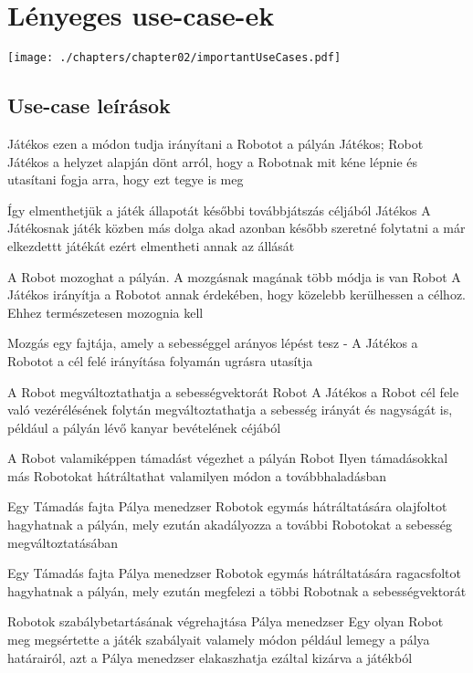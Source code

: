 \section{Lényeges use-case-ek}
\texttt{[image: ./chapters/chapter02/importantUseCases.pdf]}

\subsection{Use-case leírások}

%
{Játékos ezen a módon tudja irányítani a Robotot a pályán}%
{Játékos; Robot}%
{Játékos a helyzet alapján dönt arról, hogy a Robotnak mit kéne lépnie és utasítani fogja arra, hogy ezt tegye is meg}

%
{Így elmenthetjük a játék állapotát későbbi továbbjátszás céljából}%
{Játékos}%
{A Játékosnak játék közben más dolga akad azonban később szeretné folytatni a már elkezdettt játékát ezért elmentheti annak az állását}

%
{A Robot mozoghat a pályán. A mozgásnak magának több módja is van}
{Robot}
{A Játékos irányítja a Robotot annak érdekében, hogy közelebb kerülhessen a célhoz. Ehhez természetesen mozognia kell}

%
{Mozgás egy fajtája, amely a sebességgel arányos lépést tesz}%
{-}%
{A Játékos a Robotot a cél felé irányítása folyamán ugrásra utasítja}

%
{A Robot megváltoztathatja a sebességvektorát}%
{Robot}%
{A Játékos a Robot cél fele való vezérélésének folytán megváltoztathatja a sebesség irányát és nagyságát is, például a pályán lévő kanyar bevételének céjából}

%
{A Robot valamiképpen támadást végezhet a pályán}%
{Robot}%
{Ilyen támadásokkal más Robotokat hátráltathat valamilyen módon a továbbhaladásban}

%
{Egy Támadás fajta}%
{Pálya menedzser}%
{Robotok egymás hátráltatására olajfoltot hagyhatnak a pályán, mely ezután akadályozza a további Robotokat a sebesség megváltoztatásában}

%
{Egy Támadás fajta}%
{Pálya menedzser}%
{Robotok egymás hátráltatására ragacsfoltot hagyhatnak a pályán, mely ezután megfelezi a többi Robotnak a sebességvektorát}

%
{Robotok szabálybetartásának végrehajtása}%
{Pálya menedzser}%
{Egy olyan Robot meg megsértette a játék szabályait valamely módon például lemegy a pálya határairól, azt a Pálya menedzser elakaszhatja ezáltal kizárva a játékból}

